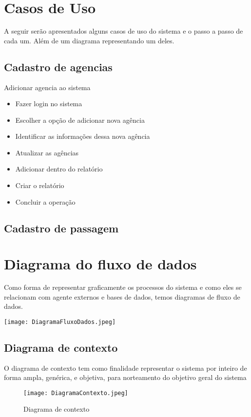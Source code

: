 \section{ Casos de Uso}
A seguir serão apresentados alguns casos de uso do sistema e o passo a passo de cada um. Além de
um diagrama representando um deles.


\subsection{Cadastro de agencias}
Adicionar agencia ao sistema
\begin{itemize}
  \item Fazer login no sistema
  \item Escolher a opção de adicionar nova agência
  \item Identificar as informações dessa nova agência
  \item Atualizar as agências
  \item Adicionar dentro do relatório
  \item Criar o relatório
  \item Concluir a operação
\end{itemize}

\subsection{Cadastro de passagem}


\section{Diagrama do fluxo de dados}
Como forma de representar graficamente os processos do sistema e como eles se relacionam com
agente externos e bases de dados, temos diagramas de fluxo de dados.

\texttt{[image: DiagramaFluxoDados.jpeg]}


\subsection{Diagrama de contexto}
O diagrama de contexto tem como finalidade representar o sistema por inteiro de forma ampla,
genérica, e objetiva, para norteamento do objetivo geral do sistema

\begin{figure}
  \caption{Diagrama de contexto}
  \centering
  \texttt{[image: DiagramaContexto.jpeg]}
\end{figure}
\break



